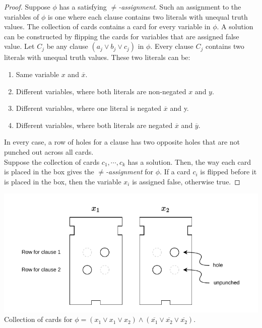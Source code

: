 \documentclass[11pt]{article}
\begin{document}
\begin{proof}
Suppose $\phi$ has a satisfying $\neq$\textit{-assignment}. Such an assignment to the variables of $\phi$ is one where each clause contains two literals with unequal truth values. The collection of cards contains a card for every variable in $\phi$. A solution can be constructed by flipping the cards for variables that are assigned false value. Let $C_j$ be any clause $(a_j \vee b_j \vee c_j)$ in $\phi$. Every clause $C_j$ contains two literals with unequal truth values. These two literals can be:
\begin{enumerate}
\item Same variable $x$ and $\overline{x}$.
\item Different variables, where both literals are non-negated $x$ and $y$.
\item Different variables, where one literal is negated $\overline{x}$ and y.
\item Different variables, where both literals are negated $\overline{x}$ and $\overline{y}$.
\end{enumerate}

In every case, a row of holes for a clause has two opposite holes that are not punched out across all cards. \\

Suppose the collection of cards $c_1,\cdots, c_k$ has a solution. Then, the way each card is placed in the box gives the $\neq$\textit{-assignment} for $\phi$. If a card $c_i$ is flipped before it is placed in the box, then the variable $x_i$ is assigned false, otherwise true.

\end{proof}
\begin{center}
\includegraphics[scale=1.0]{Figures/Problem7.28.pdf} \\
Collection of cards for $\phi = (x_1 \vee x_1 \vee x_2) \wedge (\overline{x_1} \vee \overline{x_2} \vee \overline{x_2})$.
\end{center}
\end{document}
